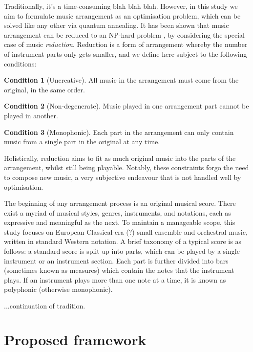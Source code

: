 \documentclass[12pt]{article}
\theoremstyle{definition}
\newtheorem{condition}{Condition}
\begin{document}
Traditionally, it's a time-consuming blah blah blah. However, in this study we aim to formulate music arrangement as an optimisation problem, which can be solved like any other via quantum annealing. It has been shown that music arrangement can be reduced to an NP-hard problem \cite{moses_computational_2016}, by considering the special case of music \emph{reduction}. Reduction is a form of arrangement whereby the number of instrument parts only gets smaller, and we define here subject to the following conditions:

\begin{condition}[Uncreative]
    All music in the arrangement must come from the original, in the same order.
    \label{con:uncreative}
\end{condition}
\begin{condition}[Non-degenerate]
    Music played in one arrangement part cannot be played in another.
    \label{con:non-degenerate}
\end{condition}
\begin{condition}[Monophonic]
    Each part in the arrangement can only contain music from a single part in the original at any time.
    \label{con:monophonic}
\end{condition}

Holistically, reduction aims to fit as much original music into the parts of the arrangement, whilst still being playable. Notably, these constraints forgo the need to compose new music, a very subjective endeavour that is not handled well by optimisation.

The beginning of any arrangement process is an original musical score. There exist a myriad of musical styles, genres, instruments, and notations, each as expressive and meaningful as the next. To maintain a manageable scope, this study focuses on European Classical-era (?) small ensemble and orchestral music, written in standard Western notation. A brief taxonomy of a typical score is as follows: a standard score is split up into parts, which can be played by a single instrument or an instrument section. Each part is further divided into bars (sometimes known as measures) which contain the notes that the instrument plays. If an instrument plays more than one note at a time, it is known as polyphonic (otherwise monophonic).

...continuation of tradition.

\section{Proposed framework}
\end{document}
